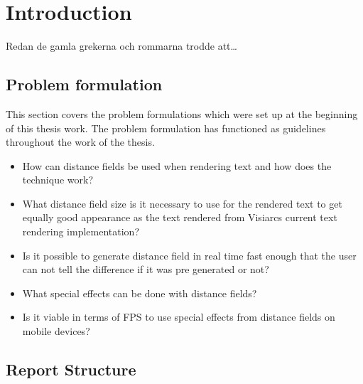 \chapter{Introduction}\label{cha:intro}
Redan de gamla grekerna och rommarna trodde att\dots
\section{Problem formulation}
This section covers the problem formulations which were set up at the beginning of this thesis work. The problem formulation has functioned as guidelines throughout the work of the thesis.
\begin{itemize}
  \item How can distance fields be used when rendering text and how does the technique work?
  \item What distance field size is it necessary to use for the rendered text to get equally good appearance as the text rendered from Visiarcs current text rendering implementation?
  \item Is it possible to generate distance field in real time fast enough that the user can not tell the difference if it was pre generated or not?
	\item What special effects can be done with distance fields?
	\item Is it viable in terms of FPS to use special effects from distance fields on mobile devices? 
\end{itemize}
\section{Report Structure}

